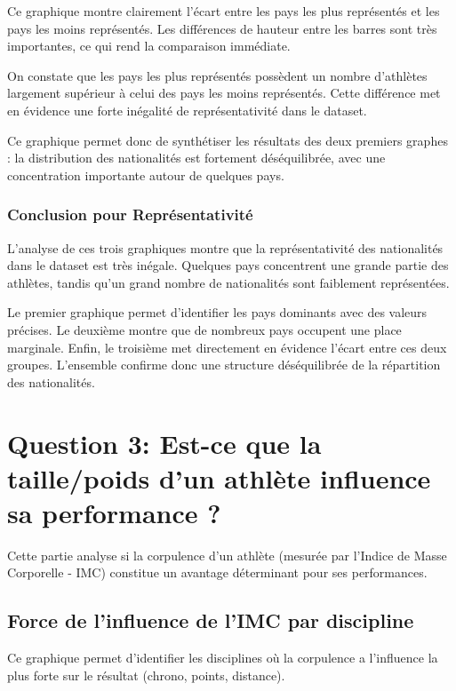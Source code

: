 \documentclass[
]{article}
\begin{document}
Ce graphique montre clairement l'écart entre les pays les plus
représentés et les pays les moins représentés. Les différences de
hauteur entre les barres sont très importantes, ce qui rend la
comparaison immédiate.

On constate que les pays les plus représentés possèdent un nombre
d'athlètes largement supérieur à celui des pays les moins représentés.
Cette différence met en évidence une forte inégalité de représentativité
dans le dataset.

Ce graphique permet donc de synthétiser les résultats des deux premiers
graphes : la distribution des nationalités est fortement déséquilibrée,
avec une concentration importante autour de quelques pays.

\subsubsection{Conclusion pour
Représentativité}\label{conclusion-pour-repruxe9sentativituxe9}

L'analyse de ces trois graphiques montre que la représentativité des
nationalités dans le dataset est très inégale. Quelques pays concentrent
une grande partie des athlètes, tandis qu'un grand nombre de
nationalités sont faiblement représentées.

Le premier graphique permet d'identifier les pays dominants avec des
valeurs précises. Le deuxième montre que de nombreux pays occupent une
place marginale. Enfin, le troisième met directement en évidence l'écart
entre ces deux groupes. L'ensemble confirme donc une structure
déséquilibrée de la répartition des nationalités.

\section{Question 3: Est-ce que la taille/poids d'un athlète influence
sa performance
?}\label{question-3-est-ce-que-la-taillepoids-dun-athluxe8te-influence-sa-performance}

Cette partie analyse si la corpulence d'un athlète (mesurée par l'Indice
de Masse Corporelle - IMC) constitue un avantage déterminant pour ses
performances.

\subsection{Force de l'influence de l'IMC par
discipline}\label{force-de-linfluence-de-limc-par-discipline}

Ce graphique permet d'identifier les disciplines où la corpulence a
l'influence la plus forte sur le résultat (chrono, points, distance).
\end{document}
